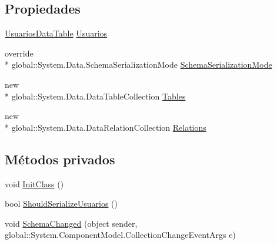 \subsection*{Propiedades}
\begin{DoxyCompactItemize}
\item 
\hyperlink{class_proyecto___integrador__3_1_1ds_usuarios_1_1_usuarios_data_table}{Usuarios\-Data\-Table} \hyperlink{class_proyecto___integrador__3_1_1ds_usuarios_a79d1cfd31914c2c5cfda39b62381478b}{Usuarios}
\item 
override \\*
global\-::\-System.\-Data.\-Schema\-Serialization\-Mode \hyperlink{class_proyecto___integrador__3_1_1ds_usuarios_aed33539fcaa97590918e8ab6153de8ba}{Schema\-Serialization\-Mode}
\item 
new \\*
global\-::\-System.\-Data.\-Data\-Table\-Collection \hyperlink{class_proyecto___integrador__3_1_1ds_usuarios_a5a3e80b30906b3389a7282cdf5dd621c}{Tables}
\item 
new \\*
global\-::\-System.\-Data.\-Data\-Relation\-Collection \hyperlink{class_proyecto___integrador__3_1_1ds_usuarios_ac1a722fbe5919c3d98ef3cc923978cec}{Relations}
\end{DoxyCompactItemize}
\subsection*{Métodos privados}
\begin{DoxyCompactItemize}
\item 
void \hyperlink{class_proyecto___integrador__3_1_1ds_usuarios_ad0c908e49d82059c569e57ea67647273}{Init\-Class} ()
\item 
bool \hyperlink{class_proyecto___integrador__3_1_1ds_usuarios_a3f560338d4d7d5d6592ceb8ab433b1a6}{Should\-Serialize\-Usuarios} ()
\item 
void \hyperlink{class_proyecto___integrador__3_1_1ds_usuarios_a48c9727d0752dcca6fa0cc10e6937861}{Schema\-Changed} (object sender, global\-::\-System.\-Component\-Model.\-Collection\-Change\-Event\-Args e)
\end{DoxyCompactItemize}
